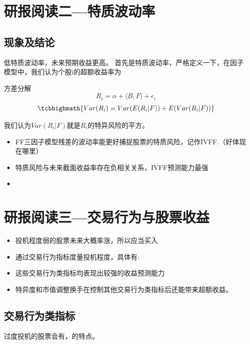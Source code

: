 \documentclass[12pt]{article}
\theoremstyle{definition}
\newcommand{\inner}[2]{{\langle #1,#2\rangle}}
\begin{document}
\section{研报阅读二—特质波动率}
\subsection{现象及结论}
低特质波动率，未来预期收益更高。
首先是特质波动率，严格定义一下，在因子模型中，我们认为个股i的超额收益率为
\begin{stheorem}{方差分解}{}
$$
R_i = \alpha + \inner{B}{F} + \epsilon_i
$$
$$
\tcbhighmath{Var(R_i)=Var(E(R_i|F))+E(Var(R_i|F))}
$$
\end{stheorem}
我们认为$Var(R_i|F)$就是$R_i$的特异风险的平方。

\begin{sconclude}{}{}
\vspace{-.4mm}
\begin{itemize}
	\item FF三因子模型残差的波动率能更好捕捉股票的特质风险，记作IVFF.（好体现在哪里）
	\item 特质风险与未来截面收益率存在负相关关系，IVFF预测能力最强
	\item 
\end{itemize}
\end{sconclude}


\section{研报阅读三—交易行为与股票收益}
\begin{sconclude}{}{}
\begin{itemize}
	\item 投机程度弱的股票未来大概率涨，所以应当买入
	\item 通过交易行为指标度量投机程度，具体有: \\ 
	\item 这些交易行为类指标均表现出较强的收益预测能力
	\item 特异度和市值调整换手在控制其他交易行为类指标后还能带来超额收益。
\end{itemize} 
\end{sconclude}

\subsection{交易行为类指标}
过度投机的股票会有，的特点。
\end{document}

